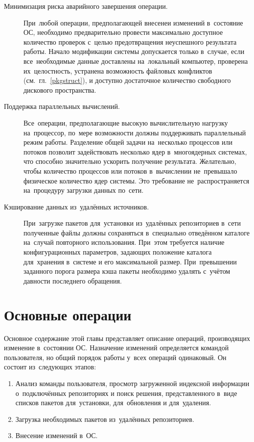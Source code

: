 \begin{description}
\item[Минимизация риска аварийного завершения операции.]
При~любой операции, предполагающей внесенеи изменений в~состояние ОС, необходимо предварительно 
провести максимально доступное количество проверок с~целью предотвращения неуспешного результата работы.
Начало модификации системы допускается только в~случае, если все~необходимые данные доставлены на~локальный компьютер,
проверена их~целостность, устранена возможность файловых конфликтов (см.~гл.~\ref{pkgstruct}), и доступно достаточное количество свободного дискового пространства.

\item[Поддержка параллельных вычислений.]
Все~операции, предполагающие высокую вычислительную нагрузку на~процессор,
по~мере возможности должны поддерживать параллельный режим работы.
Разделение общей задачи на~несколько процессов или потоков позволит задействовать несколько ядер в~многоядерных системах,
что способно значительно ускорить получение результата. 
Желательно, чтобы количество процессов или потоков в~вычислении не~превышало физическое количество ядер системы.
Это требование не~распространяется на~процедуру загрузки данных по~сети.

\item[Кэширование данных из~удалённых источников.]
При~загрузке пакетов для~установки из~удалённых репозиториев в~сети
полученные файлы должны сохраняться в~специально отведённом каталоге на~случай повторного использования.
При~этом требуется наличие конфигурационных параметров, задающих положение каталога для~хранения в~системе и его максимальной размер.
При~превышении заданного порога размера кэша пакеты необходимо удалять с~учётом давности последнего обращения.

\end{description}

\section{Основные операции}

Основное содержание этой главы представляет описание операций, производящих изменение в~состоянии ОС.
Назначение  изменений определяется командой пользователя, но общий порядок работы у~всех операций одинаковый.
Он состоит из~следующих этапов:

\begin{enumerate}

\item{
Анализ команды пользователя, просмотр загруженной индексной информации о~подключённых репозиториях
и поиск решения, представленного в~виде списков пакетов для~установки, для~обновления и для~удаления.
}

\item {Загрузка необходимых пакетов из~удалённых репозиториев.}
\item {Внесение изменений в~ОС.}

\end{enumerate}


